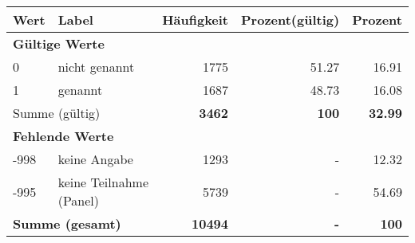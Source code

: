      \begin{longtable}{lXrrr}
     \toprule
     \textbf{Wert} & \textbf{Label} & \textbf{Häufigkeit} & \textbf{Prozent(gültig)} & \textbf{Prozent} \\
     \endhead
     \midrule
     \multicolumn{5}{l}{\textbf{Gültige Werte}}\\

     0 &
     \multicolumn{1}{X}{ nicht genannt   } &


       \num{1775} &
       \num[round-mode=places,round-precision=2]{51,27} &
         \num[round-mode=places,round-precision=2]{16,91} \\

     1 &
     \multicolumn{1}{X}{ genannt   } &


       \num{1687} &
       \num[round-mode=places,round-precision=2]{48,73} &
         \num[round-mode=places,round-precision=2]{16,08} \\
     \midrule
     \multicolumn{2}{l}{Summe (gültig)} &
       \textbf{\num{3462}} &
     \textbf{100} &
       \textbf{\num[round-mode=places,round-precision=2]{32,99}} \\
     \multicolumn{5}{l}{\textbf{Fehlende Werte}}\\
       -998 &
       keine Angabe &
         \num{1293} &
        - &
         \num[round-mode=places,round-precision=2]{12,32} \\
       -995 &
       keine Teilnahme (Panel) &
         \num{5739} &
        - &
         \num[round-mode=places,round-precision=2]{54,69} \\
     \midrule
     \multicolumn{2}{l}{\textbf{Summe (gesamt)}} &
          \textbf{\num{10494}} &
        \textbf{-} &
        \textbf{100} \\
     \bottomrule
     \end{longtable}
     
